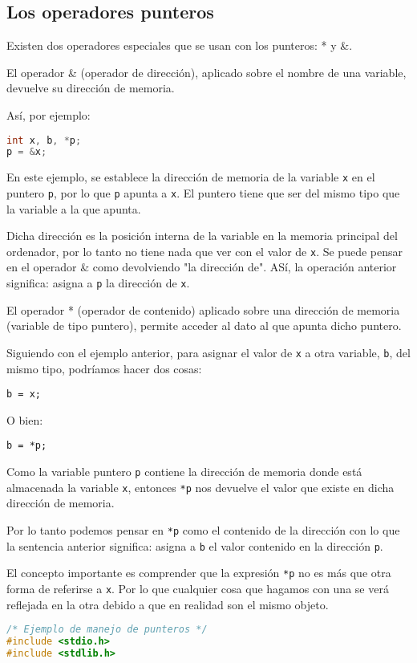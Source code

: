 \subsection{Los operadores punteros}{
Existen dos operadores especiales que se usan con los punteros: * y \&.

El operador \& (operador de dirección), aplicado sobre el nombre de una variable, devuelve su dirección de memoria.

Así, por ejemplo:
\begin{Ejemplo}
\begin{lstlisting}[language=C]
int x, b, *p;
p = &x;
\end{lstlisting}
\Explicacion
En este ejemplo, se establece la dirección de memoria de la variable \texttt{x} en el puntero \texttt{p}, por lo que \texttt{p} apunta a \texttt{x}. El puntero tiene que ser del mismo tipo que la variable a la que apunta.

Dicha dirección es la posición interna de la variable en la memoria principal del ordenador, por lo tanto no tiene nada que ver con el valor de \texttt{x}. Se puede pensar en el operador \& como devolviendo "la dirección de". ASí, la operación anterior significa: asigna a \texttt{p} la dirección de \texttt{x}.\\
\end{Ejemplo}

El operador * (operador de contenido) aplicado sobre una dirección de memoria (variable de tipo puntero), permite acceder al dato al que apunta dicho puntero.

Siguiendo con el ejemplo anterior, para asignar el valor de \texttt{x} a otra variable, \texttt{b}, del mismo tipo, podríamos hacer dos cosas:

\texttt{b = x;}

O bien:

\texttt{b = *p;}

Como la variable puntero \texttt{p} contiene la dirección de memoria donde está almacenada la variable \texttt{x}, entonces \texttt{*p} nos devuelve el valor que existe en dicha dirección de memoria.

Por lo tanto podemos pensar en \texttt{*p} como el contenido de la dirección con lo que la sentencia anterior significa: asigna a \texttt{b} el valor contenido en la dirección \texttt{p}.

El concepto importante es comprender que la expresión \texttt{*p} no es más que otra forma de referirse a \texttt{x}. Por lo que cualquier cosa que hagamos con una se verá reflejada en la otra debido a que en realidad son el mismo objeto.
\newpage
\begin{Ejemplo}
\begin{lstlisting}[language=C]
/* Ejemplo de manejo de punteros */
#include <stdio.h>
#include <stdlib.h>


\end{lstlisting}
\end{Ejemplo}}
